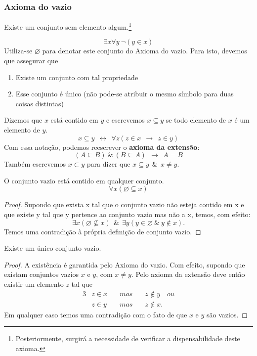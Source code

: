       \subsubsection{Axioma do vazio}
         \begin{stat}
            Existe um conjunto sem elemento algum.\footnote[2]{Posteriormente, surgirá a necessidade de verificar a dispensabilidade deste axioma.}
         \end{stat}    
         $$\exists x \forall y\ \neg(y \in x)$$
         Utiliza-se $\varnothing$ para denotar este conjunto do Axioma do vazio. Para isto, devemos que assegurar que
         \begin{enumerate}
            \item Existe um conjunto com tal propriedade
            \item Esse conjunto é único (não pode-se atribuir o mesmo símbolo para duas coisas distintas)
         \end{enumerate}
         \begin{definition}
            Dizemos que $x$ está contido em $y$ e escrevemos $x \subseteq y$ se todo elemento de $x$ é um elemento de $y$. 
            $$ x \subseteq y\ \ \leftrightarrow\ \ \forall z (z \in x\ \ \rightarrow\ \ z \in y)$$
            Com essa notação, podemos reescrever o \textbf{axioma da extensão}: $$(A \subseteq B)\ \&\ (B \subseteq A)\ \ \rightarrow\ \ A = B$$
            Também escrevemos $x \subset y$ para dizer que $x \subseteq y\ \ \&\ \ x \neq y$.
         \end{definition}
         \begin{theorem}\label{T1}
            O conjunto vazio está contido em qualquer conjunto.
            $$\forall x (\varnothing \subseteq x)$$
         \end{theorem}
         \begin{proof}
            Supondo que exista x tal que o conjunto vazio não esteja contido em x e que existe y tal que y pertence ao conjunto vazio mas não a x, temos, com efeito: 
            $$\exists x(\varnothing \nsubseteq x)\ \ \&\ \ \exists y(y \in \varnothing\ \&\ y \notin x).$$
            Temos uma contradição à própria definição de conjunto vazio.
         \end{proof}
         \begin{theorem}\label{T2}
            Existe um único conjunto vazio.    
         \end{theorem}
         \begin{proof}
            A existência é garantida pelo Axioma do vazio. Com efeito, supondo que existam conjuntos vazios $x$ e $y$, com $x \neq y$. Pelo axioma da extensão deve então existir um elemento $z$ tal que
            \begin{alignat*}{3}
               & z \in x  \quad & mas \quad & z \notin y\quad ou\\
               & z \in y  \quad & mas \quad & z \notin x.
            \end{alignat*}
            Em qualquer caso temos uma contradição com o fato de que $x$ e $y$ são vazios.
         \end{proof}
